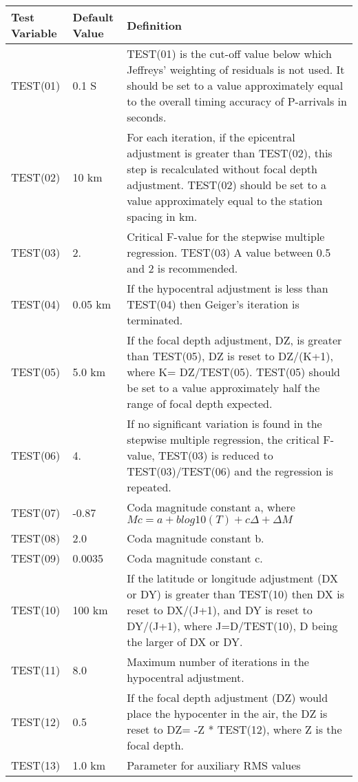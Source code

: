 \begin{tabular}{|l|l|p{7cm}|}
\hline
Test Variable & Default Value & Definition \\
\hline
TEST(01) &  0.1 S &  TEST(01) is the cut-off value below which Jeffreys' weighting of residuals is not used. It should be set to a value approximately equal to the overall timing accuracy of P-arrivals in seconds.  \\
TEST(02) &  10 km &  For each iteration, if the epicentral adjustment is greater than TEST(02), this step is recalculated without focal depth adjustment. TEST(02) should be set to a value approximately equal to the station spacing in km.  \\
TEST(03) &  2. &  Critical F-value for the stepwise multiple regression. TEST(03) A value between 0.5 and 2 is recommended.  \\
TEST(04) &  0.05 km &  If the hypocentral adjustment is less than TEST(04) then Geiger's iteration is terminated.  \\
TEST(05) &  5.0 km &  If the focal depth adjustment, DZ, is greater than TEST(05), DZ is reset to DZ/(K+1), where K= DZ/TEST(05). TEST(05) should be set to a value approximately half the range of focal depth expected.  \\
TEST(06) &  4. &  If no significant variation is found in the stepwise multiple regression, the critical F-value, TEST(03) is reduced to TEST(03)/TEST(06) and the regression is repeated.  \\
TEST(07) &  -0.87 &  Coda magnitude constant a, where $Mc = a + b log10(T) + c \Delta + \Delta M$  \\
TEST(08) &  2.0 &  Coda magnitude constant b.  \\
TEST(09) &  0.0035 &  Coda magnitude constant c.  \\
TEST(10) &  100 km &  If the latitude or longitude adjustment (DX or DY) is greater than TEST(10) then DX is reset to DX/(J+1), and DY is reset to DY/(J+1), where J=D/TEST(10), D being the larger of DX or DY.  \\
TEST(11) &  8.0 &  Maximum number of iterations in the hypocentral adjustment.  \\
TEST(12) &  0.5 &  If the focal depth adjustment (DZ) would place the hypocenter in the air, the DZ is reset to DZ= -Z * TEST(12), where Z is the focal depth.  \\
TEST(13) &  1.0 km &  Parameter for auxiliary RMS values  \\
\hline
\end{tabular}
\newline

